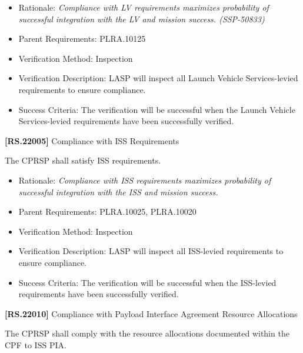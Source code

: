\begin{itemize}
\item{} Rationale: \emph{Compliance with LV requirements maximizes probability of successful integration with the LV and mission success. (SSP-50833)}

\item{} Parent Requirements: PLRA.10125

\item{} Verification Method: Inspection

\item{} Verification Description: \gls{LASP} will inspect all Launch Vehicle Services-levied requirements to ensure compliance.

\item{} Success Criteria: The verification will be successful when the Launch Vehicle Services-levied requirements have been successfully verified.

\end{itemize}

\textbf{[RS.22005]} Compliance with \gls{ISS} Requirements

The \gls{CPRSP} shall satisfy \gls{ISS} requirements.

\begin{itemize}
\item{} Rationale: \emph{Compliance with ISS requirements maximizes probability of successful integration with the ISS and mission success.}

\item{} Parent Requirements: PLRA.10025, PLRA.10020

\item{} Verification Method: Inspection

\item{} Verification Description: \gls{LASP} will inspect all \gls{ISS}-levied requirements to ensure compliance.

\item{} Success Criteria: The verification will be successful when the \gls{ISS}-levied requirements have been successfully verified.

\end{itemize}

\textbf{[RS.22010]} Compliance with Payload Interface Agreement Resource Allocations

The \gls{CPRSP} shall comply with the resource allocations documented within the \gls{CPF} to \gls{ISS} \gls{PIA}.

